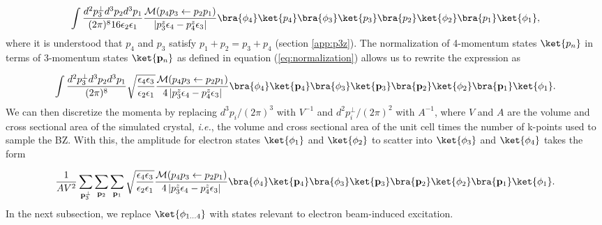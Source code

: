 \documentclass{article}
\begin{document}
\begin{equation} 
  \label{eq:ampUseDelta} 
  \begin{aligned} 
    \int\frac{d^2p_3^\perp
    d^3p_2d^3p_1} {(2\pi)^{8} 16\epsilon_2\epsilon_1}
    \frac{\mathcal{M}(p_4p_3\leftarrow p_2p_1)}
    {\left|p_3^z\epsilon_4 - p_4^z\epsilon_3\right|} \bra{\phi_4}\ket{p_4}
    \bra{\phi_3}\ket{p_3} \bra{p_2}\ket{\phi_2} \bra{p_1}\ket{\phi_1},
  \end{aligned} 
\end{equation}
%
where it is understood that $p_4$ and $p_3$ satisfy $p_1 + p_2 = p_3 + p_4$
(section \ref{app:p3z}).
The normalization of 4-momentum states $\ket{p_n}$ in terms of
3-momentum states $\ket{\mathbf{p}_n}$ as defined in equation
(\ref{eq:normalization}) allows us to rewrite the expression as

\begin{equation} 
  \label{eq:amp3Mom} 
  \begin{aligned} 
    \int\frac{d^2p_3^\perp
    d^3p_2d^3p_1}{(2\pi)^{8}}
    \sqrt{\frac{\epsilon_4\epsilon_3}{\epsilon_2\epsilon_1}}
    \frac{\mathcal{M}(p_4p_3\leftarrow p_2p_1)} {4\left|p_3^z\epsilon_4 -
    p_4^z\epsilon_3\right|} \bra{\phi_4}\ket{\mathbf{p}_4}
    \bra{\phi_3}\ket{\mathbf{p}_3} \bra{\mathbf{p}_2}\ket{\phi_2}
    \bra{\mathbf{p}_1}\ket{\phi_1}.  
  \end{aligned} 
\end{equation}
%
We can then discretize the momenta by replacing $d^3p_i/(2\pi)^3$ with $V^{-1}$
and $d^2p_i^\perp/(2\pi)^2$ with $A^{-1}$, where $V$ and $A$ are the volume and
cross sectional area of the simulated crystal, \textit{i.e.}, the volume and
cross sectional area of the unit cell times the number of k-points used to
sample the BZ.
With this, the amplitude for electron states $\ket{\phi_1}$ and $\ket{\phi_2}$
to scatter into $\ket{\phi_3}$ and $\ket{\phi_4}$ takes the form

\begin{equation} 
  \label{eq:ampDisc} 
  \begin{aligned} 
    \frac{1}{AV^2}
    \sum_{\mathbf{p}_3^\perp} \sum_{\mathbf{p}_2} \sum_{\mathbf{p}_1}
    \sqrt{\frac{\epsilon_4\epsilon_3}{\epsilon_2\epsilon_1}}
    \frac{\mathcal{M}(p_4p_3\leftarrow p_2p_1)} {4\left|p_3^z\epsilon_4 -
    p_4^z\epsilon_3\right|} \bra{\phi_4}\ket{\mathbf{p}_4}
    \bra{\phi_3}\ket{\mathbf{p}_3} \bra{\mathbf{p}_2}\ket{\phi_2}
    \bra{\mathbf{p}_1}\ket{\phi_1}.  
  \end{aligned} 
\end{equation}
%
In the next subsection, we replace $\ket{\phi_{1\dots 4}}$ with states relevant to
electron beam-induced excitation.
\end{document}
